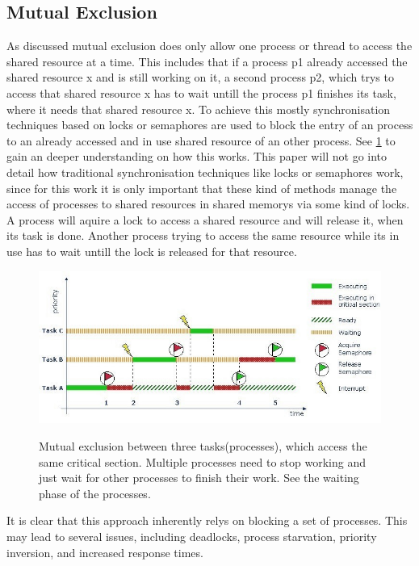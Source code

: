 \subsection{Mutual Exclusion}\label{subsec:mutual-exclusion}

As discussed mutual exclusion does only allow one process or thread to access the shared resource at a time. This includes that if a process p1 already accessed the shared resource x and is still working on it, a second process p2, which trys to access that shared resource x has to wait untill the process p1 finishes its task, where it needs that shared resource x. To achieve this mostly synchronisation techniques based on locks or semaphores are used to block the entry of an process to an already accessed and in use shared resource of an other process. See \cref{fig:mutual-exclusion} to gain an deeper understanding on how this works. This paper will not go into detail how traditional synchronisation techniques like locks or semaphores work, since for this work it is only important that these kind of methods manage the access of processes to shared resources in shared memorys via some kind of locks. A process will aquire a lock to access a shared resource and will release it, when its task is done. Another process trying to access the same resource while its in use has to wait untill the lock is released for that resource.

\begin{figure}[h!]
   \centering
   \captionsetup{justification=centering}
   \caption{Mutual exclusion between three tasks(processes), which access the same critical section. Multiple processes need to stop working and just wait for other processes to finish their work. See the waiting phase of the processes. \cite{MutualExclusion}}
   \includegraphics[width=135mm]{images/mutual_exclusion.jpg}
   \label{fig:mutual-exclusion}
\end{figure}

It is clear that this approach inherently relys on blocking a set of processes. This may lead to several issues, including deadlocks, process starvation, priority inversion, and increased response times. \cite{brandenburg2019multiprocessorrealtimelockingprotocols,MutexSemaphoreIPC}

